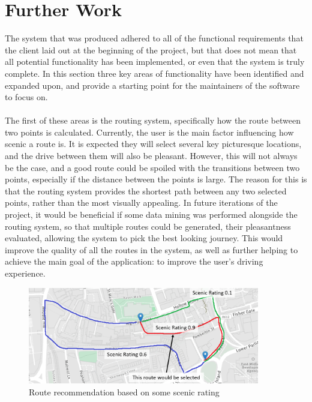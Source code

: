 \section{Further Work}
The system that was produced adhered to all of the functional requirements that the client laid out at the beginning of the project, but that does not mean that all potential functionality has been implemented, or even that the system is truly complete. In this section three key areas of functionality have been identified and expanded upon, and provide a starting point for the maintainers of the software to focus on.\ \\
\ \\
The first of these areas is the routing system, specifically how the route between two points is calculated. Currently, the user is the main factor influencing how scenic a route is. It is expected they will select several key picturesque locations, and the drive between them will also be pleasant. However, this will not always be the case, and a good route could be spoiled with the transitions between two points, especially if the distance between the points is large. The reason for this is that the routing system provides the shortest path between any two selected points, rather than the most visually appealing. In future iterations of the project, it would be beneficial if some data mining was performed alongside the routing system, so that multiple routes could be generated, their pleasantness evaluated, allowing the system to pick the best looking journey. This would improve the quality of all the routes in the system, as well as further helping to achieve the main goal of the application: to improve the user's driving experience.\ \\
\begin{figure}[!ht]
	\vspace{-3mm}
	\begin{center}
		\includegraphics[width=0.9\textwidth]{images/further/alt.png}
	\end{center}
	\vspace{-6mm}
	\caption{Route recommendation based on some scenic rating}	
\end{figure}
